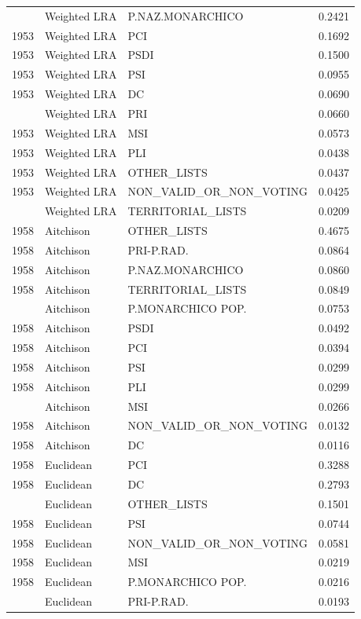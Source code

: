 \begin{longtable}[t]{rllr}
\addlinespace
1953 & Weighted LRA & P.NAZ.MONARCHICO & 0.2421\\
1953 & Weighted LRA & PCI & 0.1692\\
1953 & Weighted LRA & PSDI & 0.1500\\
1953 & Weighted LRA & PSI & 0.0955\\
1953 & Weighted LRA & DC & 0.0690\\
\addlinespace
1953 & Weighted LRA & PRI & 0.0660\\
1953 & Weighted LRA & MSI & 0.0573\\
1953 & Weighted LRA & PLI & 0.0438\\
1953 & Weighted LRA & OTHER\_LISTS & 0.0437\\
1953 & Weighted LRA & NON\_VALID\_OR\_NON\_VOTING & 0.0425\\
\addlinespace
1953 & Weighted LRA & TERRITORIAL\_LISTS & 0.0209\\
1958 & Aitchison & OTHER\_LISTS & 0.4675\\
1958 & Aitchison & PRI-P.RAD. & 0.0864\\
1958 & Aitchison & P.NAZ.MONARCHICO & 0.0860\\
1958 & Aitchison & TERRITORIAL\_LISTS & 0.0849\\
\addlinespace
1958 & Aitchison & P.MONARCHICO POP. & 0.0753\\
1958 & Aitchison & PSDI & 0.0492\\
1958 & Aitchison & PCI & 0.0394\\
1958 & Aitchison & PSI & 0.0299\\
1958 & Aitchison & PLI & 0.0299\\
\addlinespace
1958 & Aitchison & MSI & 0.0266\\
1958 & Aitchison & NON\_VALID\_OR\_NON\_VOTING & 0.0132\\
1958 & Aitchison & DC & 0.0116\\
1958 & Euclidean & PCI & 0.3288\\
1958 & Euclidean & DC & 0.2793\\
\addlinespace
1958 & Euclidean & OTHER\_LISTS & 0.1501\\
1958 & Euclidean & PSI & 0.0744\\
1958 & Euclidean & NON\_VALID\_OR\_NON\_VOTING & 0.0581\\
1958 & Euclidean & MSI & 0.0219\\
1958 & Euclidean & P.MONARCHICO POP. & 0.0216\\
\addlinespace
1958 & Euclidean & PRI-P.RAD. & 0.0193\\

\end{longtable}
